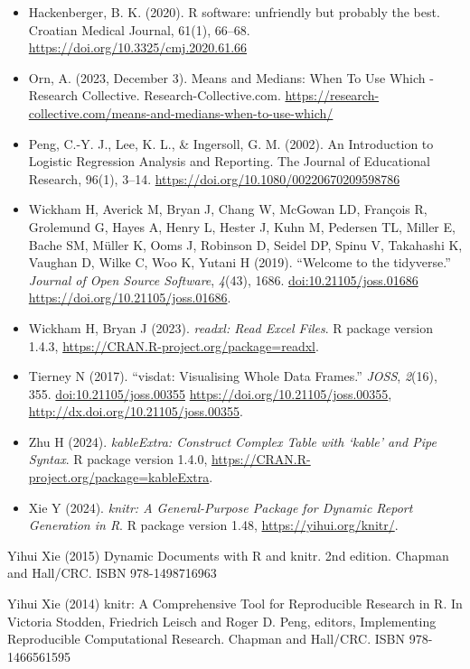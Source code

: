 \documentclass[
]{article}
\begin{document}
\begin{itemize}
\item
  Hackenberger, B. K. (2020). R software: unfriendly but probably the best. Croatian Medical Journal, 61(1), 66--68. \url{https://doi.org/10.3325/cmj.2020.61.66}
\item
  Orn, A. (2023, December 3). Means and Medians: When To Use Which - Research Collective. Research-Collective.com. \url{https://research-collective.com/means-and-medians-when-to-use-which/}
\item
  Peng, C.-Y. J., Lee, K. L., \& Ingersoll, G. M. (2002). An Introduction to Logistic Regression Analysis and Reporting. The Journal of Educational Research, 96(1), 3--14. \url{https://doi.org/10.1080/00220670209598786}
\item
  Wickham H, Averick M, Bryan J, Chang W, McGowan LD, François R, Grolemund G, Hayes A, Henry L, Hester J, Kuhn M,
  Pedersen TL, Miller E, Bache SM, Müller K, Ooms J, Robinson D, Seidel DP, Spinu V, Takahashi K, Vaughan D, Wilke C,
  Woo K, Yutani H (2019). ``Welcome to the tidyverse.'' \emph{Journal of Open Source Software}, \emph{4}(43), 1686.
  \url{doi:10.21105/joss.01686} \url{https://doi.org/10.21105/joss.01686}.
\item
  Wickham H, Bryan J (2023). \emph{readxl: Read Excel Files}. R package version 1.4.3,
  \url{https://CRAN.R-project.org/package=readxl}.
\item
  Tierney N (2017). ``visdat: Visualising Whole Data Frames.'' \emph{JOSS}, \emph{2}(16), 355. \url{doi:10.21105/joss.00355}
  \url{https://doi.org/10.21105/joss.00355}, \url{http://dx.doi.org/10.21105/joss.00355}.
\item
  Zhu H (2024). \emph{kableExtra: Construct Complex Table with `kable' and Pipe Syntax}. R package version 1.4.0,
  \url{https://CRAN.R-project.org/package=kableExtra}.
\item
  Xie Y (2024). \emph{knitr: A General-Purpose Package for Dynamic Report Generation in R}. R package version 1.48,
  \url{https://yihui.org/knitr/}.
\end{itemize}

Yihui Xie (2015) Dynamic Documents with R and knitr. 2nd edition. Chapman and Hall/CRC. ISBN 978-1498716963

Yihui Xie (2014) knitr: A Comprehensive Tool for Reproducible Research in R. In Victoria Stodden, Friedrich Leisch
and Roger D. Peng, editors, Implementing Reproducible Computational Research. Chapman and Hall/CRC. ISBN
978-1466561595
\end{document}
